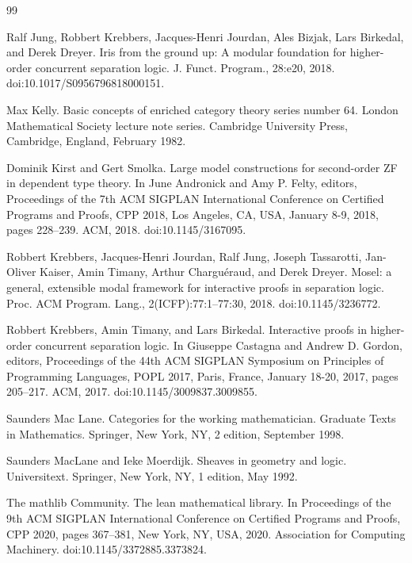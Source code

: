 \documentclass[10pt,a4paper]{article}
\begin{document}
\begin{thebibliography}{99}
\par\noindent    Ralf Jung, Robbert Krebbers, Jacques-Henri Jourdan, Ales Bizjak, Lars Birkedal, and Derek Dreyer.  Iris from the ground up: A modular foundation for higher-order concurrent separation logic.  J. Funct. Program., 28:e20, 2018.  doi:10.1017/S0956796818000151.  

\par\noindent    Max Kelly.  Basic concepts of enriched category theory series number 64.  London Mathematical Society lecture note series. Cambridge University Press, Cambridge, England, February 1982.  

\par\noindent    Dominik Kirst and Gert Smolka.  Large model constructions for second-order ZF in dependent type theory.  In June Andronick and Amy P. Felty, editors, Proceedings of the 7th ACM SIGPLAN International Conference on Certified Programs and Proofs, CPP 2018, Los Angeles, CA, USA, January 8-9, 2018, pages 228–239. ACM, 2018.  doi:10.1145/3167095.  

\par\noindent    Robbert Krebbers, Jacques-Henri Jourdan, Ralf Jung, Joseph Tassarotti, Jan-Oliver Kaiser, Amin Timany, Arthur Charguéraud, and Derek Dreyer.  Mosel: a general, extensible modal framework for interactive proofs in separation logic.  Proc. ACM Program. Lang., 2(ICFP):77:1–77:30, 2018.  doi:10.1145/3236772.  

\par\noindent    Robbert Krebbers, Amin Timany, and Lars Birkedal.  Interactive proofs in higher-order concurrent separation logic.  In Giuseppe Castagna and Andrew D. Gordon, editors, Proceedings of the 44th ACM SIGPLAN Symposium on Principles of Programming Languages, POPL 2017, Paris, France, January 18-20, 2017, pages 205–217. ACM, 2017.  doi:10.1145/3009837.3009855.  

\par\noindent    Saunders Mac Lane.  Categories for the working mathematician.  Graduate Texts in Mathematics. Springer, New York, NY, 2 edition, September 1998.  

\par\noindent    Saunders MacLane and Ieke Moerdijk.  Sheaves in geometry and logic.  Universitext. Springer, New York, NY, 1 edition, May 1992.  

\par\noindent    The mathlib Community.  The lean mathematical library.  In Proceedings of the 9th ACM SIGPLAN International Conference on Certified Programs and Proofs, CPP 2020, pages 367–381, New York, NY, USA, 2020. Association for Computing Machinery.  doi:10.1145/3372885.3373824.  


\end{thebibliography}
\end{document}
